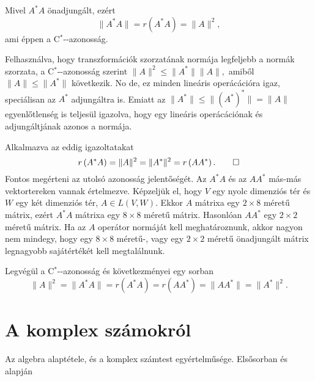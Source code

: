 \documentclass[9pt, a4paper, showtrims]{memoir}
\makeatletter
\renewenvironment{proof}[1][\proofname]
    {\par\pushQED{\qed}%
    \normalfont \topsep6\p@\@plus6\p@\relax
    \trivlist
    \item[\hskip\labelsep
        \itshape
    #1\@addpunct{:}]\ignorespaces}
    {\popQED\endtrivlist\@endpefalse}
\theoremstyle{plain}
\theoremstyle{remark}
\theoremstyle{definition}
\newcommand{\Star}[1]{#1\ensuremath{^*}\kern-\scriptspace}
\newcommand{\CStar}{\Star{\ensuremath{\mathrm{C}}}}
\makeatother
\begin{document}
\begin{proof}
    Mivel $A^\ast A$ önadjungált, ezért 
    \[
        \|A^\ast A\|=r\left(A^\ast A  \right)=\|A\|^2,
    \]
    ami éppen a \CStar-azonosság.

    Felhasználva, hogy transzformációk szorzatának normája legfeljebb a normák szorzata, 
    a \CStar-azonosság szerint 
    \begin{math}
        \|A\|^2
        \leq
        \|A^\ast\|\|A\|,
    \end{math}
    amiből $\|A\|\leq\|A^\ast\|$ következik.
    No de, ez minden lineáris operácációra igaz, 
    speciálisan az $A^\ast$ adjungáltra is.
    Emiatt az
    \begin{math}
        \|A^\ast\|
        \leq
        \|(A^\ast)^\ast\|
        =
        \|A\|
    \end{math}
    egyenlőtlenség is teljesül igazolva, 
    hogy egy lineáris operácációnak és adjungáltjának azonos a normája.

    Alkalmazva az eddig igazoltatakat
    \[
        r\left( A^\ast A \right)
        =
        \|A\|^2
        =
        \|A^\ast\|^2
        =
        r\left( AA^\ast \right).
        \qedhere
    \]
\end{proof}
Fontos megérteni az utolsó azonosság jelentőségét. 
Az $A^\ast A$ és az $AA^\ast$ más-más vektortereken vannak értelmezve.
Képzeljük el, hogy $V$ egy nyolc dimenziós tér és $W$ egy két dimenziós tér, $A\in L\left( V,W \right)$.
Ekkor $A$ mátrixa egy $2\times 8$ méretű mátrix, ezért $A^\ast A$ mátrixa egy $8\times 8$ méretű mátrix.
Hasonlóan $AA^\ast$ egy $2\times 2$ méretű mátrix.
Ha az $A$ operátor normáját kell meghatároznunk,
akkor nagyon nem mindegy, 
hogy egy $8\times 8$ méretű-, vagy egy $2\times 2$ méretű önadjungált mátrix legnagyobb sajátértékét kell megtalálnunk.

Legvégül a \CStar-azonosság és következményei egy sorban
\[
    \|A\|^2=\|A^\ast A\|=r\left( A^\ast A \right)
    =
    r\left( AA^\ast \right)=\|A A^\ast\|=\|A^\ast\|^2.
\]


\appendix
\renewcommand{\appendixpagename}{Függelékek}\renewcommand{\appendixtocname}{\appendixpagename}
\appendixpage

\chapter{A komplex számokról}
Az algebra alaptétele, és a komplex számtest egyértelműsége. Elsősorban \parencite{MR1415833} és \parencite{10.2307/3647746} alapján
\end{document}
